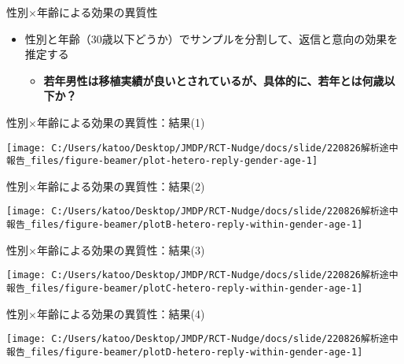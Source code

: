 \documentclass[
      aspectratio=169,
        12pt,
    ]{beamer}
\renewcommand{\textbf}[1]{{\color{DarkBlue}\bfseries#1}}
\providecommand{\tightlist}{%
  \setlength{\itemsep}{0pt}\setlength{\parskip}{0pt}}
\begin{document}
\begin{frame}{性別×年齢による効果の異質性}
\protect\hypertarget{ux6027ux5225ux5e74ux9f62ux306bux3088ux308bux52b9ux679cux306eux7570ux8ceaux6027}{}
\begin{itemize}
\tightlist
\item
  性別と年齢（30歳以下どうか）でサンプルを分割して、返信と意向の効果を推定する

  \begin{itemize}
  \tightlist
  \item
    \textbf{若年男性は移植実績が良いとされているが、具体的に、若年とは何歳以下か？}
  \end{itemize}
\end{itemize}
\end{frame}

\begin{frame}{性別×年齢による効果の異質性：結果(1)}
\protect\hypertarget{ux6027ux5225ux5e74ux9f62ux306bux3088ux308bux52b9ux679cux306eux7570ux8ceaux6027ux7d50ux679c1}{}
\begin{center}\texttt{[image: C:/Users/katoo/Desktop/JMDP/RCT-Nudge/docs/slide/220826解析途中報告\_files/figure-beamer/plot-hetero-reply-gender-age-1]} \end{center}
\end{frame}

\begin{frame}{性別×年齢による効果の異質性：結果(2)}
\protect\hypertarget{ux6027ux5225ux5e74ux9f62ux306bux3088ux308bux52b9ux679cux306eux7570ux8ceaux6027ux7d50ux679c2}{}
\begin{center}\texttt{[image: C:/Users/katoo/Desktop/JMDP/RCT-Nudge/docs/slide/220826解析途中報告\_files/figure-beamer/plotB-hetero-reply-within-gender-age-1]} \end{center}
\end{frame}

\begin{frame}{性別×年齢による効果の異質性：結果(3)}
\protect\hypertarget{ux6027ux5225ux5e74ux9f62ux306bux3088ux308bux52b9ux679cux306eux7570ux8ceaux6027ux7d50ux679c3}{}
\begin{center}\texttt{[image: C:/Users/katoo/Desktop/JMDP/RCT-Nudge/docs/slide/220826解析途中報告\_files/figure-beamer/plotC-hetero-reply-within-gender-age-1]} \end{center}
\end{frame}

\begin{frame}{性別×年齢による効果の異質性：結果(4)}
\protect\hypertarget{ux6027ux5225ux5e74ux9f62ux306bux3088ux308bux52b9ux679cux306eux7570ux8ceaux6027ux7d50ux679c4}{}
\begin{center}\texttt{[image: C:/Users/katoo/Desktop/JMDP/RCT-Nudge/docs/slide/220826解析途中報告\_files/figure-beamer/plotD-hetero-reply-within-gender-age-1]} \end{center}
\end{frame}
\end{document}
